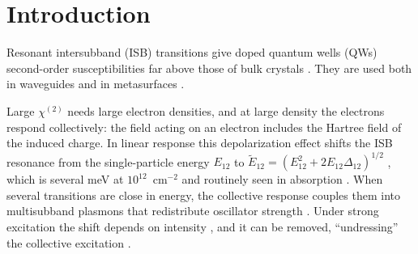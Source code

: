 \documentclass[11pt]{article}
\newcommand{\chitwo}{\chi^{(2)}}
\newcommand{\Et}{\tilde E}
\begin{document}
\begin{abstract}
For five active regions energy substitution gives the peak $|\chitwo|$ to within 6\% up to $10^{12}$~cm$^{-2}$. At $2\times10^{12}$~cm$^{-2}$ energy substitution errs by up to 18\% in $|\chitwo|$ and the local-field model by up to 20\%; at $4\times10^{12}$~cm$^{-2}$, where upper ladder levels are box-dependent resonances above the spacer band edge, the errors reach a factor of 2 and 37\%. In the optimum-length efficiency merit at double resonance energy substitution errs by up to a factor of 1.6 and the local-field model by up to a factor of 1.4. Feeding measured (already shifted) energies to a local-field model counts the depolarization twice and lowers $|\chitwo|$ by up to 49\%. Under saturation, real-time solutions at $2\times10^{12}$~cm$^{-2}$ give $|\chitwo|$ one third of a frozen-shift rate-model value at 30~MW/cm$^2$. The cause is the static Hartree field of electrons transferred between the wells by the pump: it raises $E_{12}$ by up to 15~meV, brings the 2--3 resonance onto the pump as well, and makes the two population terms of $\chitwo$ partly cancel. Up to 3~MW/cm$^2$ a rate model that includes this field reproduces the real-time $|\chitwo|$ to within 14\%. At $5\times10^{11}$~cm$^{-2}$ the frozen-shift model holds to within 10\%.
\end{abstract}

\section{Introduction}
Resonant intersubband (ISB) transitions give doped quantum wells (QWs) second-order susceptibilities far above those of bulk crystals \cite{Rosencher1991,Rosencher1996,Vurgaftman2021}. They are used both in waveguides \cite{Vurgaftman1996,Vodopyanov1998,Chesi2023,TalamasSimola2024} and in metasurfaces \cite{Lee2014,GomezDiaz2015,Nefedkin2022,Krakofsky2025}.

Large $\chitwo$ needs large electron densities, and at large density the electrons respond collectively: the field acting on an electron includes the Hartree field of the induced charge. In linear response this depolarization effect shifts the ISB resonance from the single-particle energy $E_{12}$ to $\Et_{12}=(E_{12}^2+2E_{12}\Delta_{12})^{1/2}$ \cite{Ando1982}, which is several meV at $10^{12}$~cm$^{-2}$ and routinely seen in absorption \cite{Warburton1996}. When several transitions are close in energy, the collective response couples them into multisubband plasmons that redistribute oscillator strength \cite{Delteil2012}. Under strong excitation the shift depends on intensity \cite{Zaluzny1993}, and it can be removed, ``undressing'' the collective excitation \cite{Craig1996}.
\end{document}

